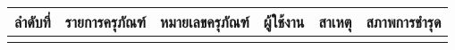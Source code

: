 \documentclass{article}
\begin{document}
\fancyheadoffset{0pt}%

\begin{tabularx}{\linewidth}{|>{\centering\arraybackslash}m{1cm}|>{\centering\arraybackslash}m{7.0cm}|>{\centering\arraybackslash}m{3.2cm}|>{\centering\arraybackslash}m{3cm}|>{\centering\arraybackslash}m{4.0cm}|>{\centering\arraybackslash}m{4.0cm}|}
 \hline

\textbf{ลำดับที่} &\textbf{รายการครุภัณฑ์}   & \centering\textbf{หมายเลขครุภัณฑ์}   & \textbf{ผู้ใช้งาน}   & \centering\textbf{สาเหตุ}  &  \textbf{สภาพการชำรุด} \\  



  \endhead
    \hline

\\
\hline
 


 

  \end{tabularx}
\end{document}
